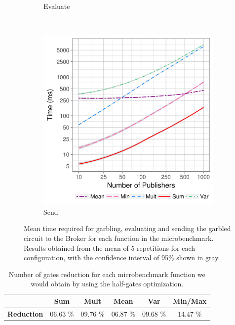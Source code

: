 \begin{figure}
\begin{subfigure}[b]{0.32\textwidth}
        \caption{Evaluate}
        \label{fig:micro-eval-time}
    \end{subfigure}
    ~ %
    \begin{subfigure}[b]{0.32\textwidth}
        \includegraphics[width=\textwidth]{plots/send_loglog.png}
        \caption{Send}
        \label{fig:micro-send-time}
    \end{subfigure}
    \caption{Mean time required for garbling, evaluating and sending the
      garbled circuit to the Broker for each function in the microbenchmark.
      Results obtained from the mean of 5 repetitions for each configuration,
      with the confidence interval of 95\% shown in gray.}
    \label{fig:micro-times}
\end{figure}

\begin{table}
    \begin{tabular}{l|*{4}{c}c}
      & \textbf{Sum} & \textbf{Mult} & \textbf{Mean} & \textbf{Var} & \textbf{Min/Max} \\
    \hline
    \textbf{Reduction} & 06.63 \% & 09.76 \% & 06.87 \% & 09.68 \% & 14.47 \% \\
    \end{tabular}
    \caption{Number of gates reduction for each microbenchmark function we
      would obtain by using the half-gates optimization.}
    \label{stats-times}
\end{table}

